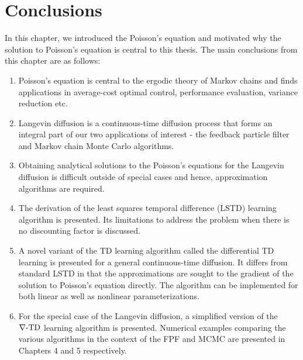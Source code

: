 \section{Conclusions}
In this chapter, we introduced the Poisson's equation and motivated why the solution to Poisson's equation is central to this thesis. The main conclusions from this chapter are as follows:
\begin{enumerate}
	\item Poisson's equation is central to the ergodic theory of Markov chains and finds applications in average-cost optimal control, performance evaluation, variance reduction etc. 
	\item Langevin diffusion is a continuous-time diffusion process that forms an integral part of our two applications of interest - the feedback particle filter and Markov chain Monte Carlo algorithms. 
	\item Obtaining analytical solutions to the Poisson's equations for the Langevin diffusion is difficult outside of special cases and hence, approximation algorithms are required. 
	\item The derivation of the least squares temporal difference (LSTD) learning algorithm is presented. Its limitations to address the problem when there is no discounting factor is discussed. 
	\item A novel variant of the TD learning algorithm called the differential TD learning is presented for a general continuous-time diffusion. It differs from standard LSTD in that the approximations are sought to the gradient of the solution to Poisson's equation directly. The algorithm can be implemented for both linear as well as nonlinear parameterizations. 
	\item For the special case of the Langevin diffusion, a simplified version of the $\nabla\text{-TD}$ learning algorithm is presented. Numerical examples comparing the various algorithms in the context of the FPF and MCMC are presented in Chapters 4 and 5 respectively. 
\end{enumerate}




